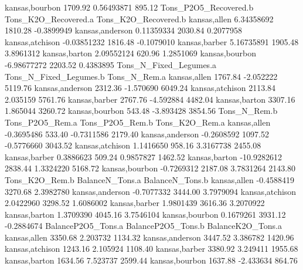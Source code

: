 \documentclass{report}
\begin{document}
\begin{Schunk}
\begin{Soutput}
kansas,bourbon             1709.92         0.56493871                895.12
                Tons_P2O5_Recovered.b Tons_K2O_Recovered.a Tons_K2O_Recovered.b
kansas,allen               6.34358692              1810.28           -0.3899949
kansas,anderson            0.11359334              2030.84            0.2077958
kansas,atchison           -0.03851232              1816.48           -0.1079010
kansas,barber              5.16735891              1905.48            3.8961312
kansas,barton              2.09552124               620.96            1.2851069
kansas,bourbon            -6.98677272              2203.52            0.4383895
                Tons_N_Fixed_Legumes.a Tons_N_Fixed_Legumes.b Tons_N_Rem.a
kansas,allen                   1767.84              -2.052222      5119.76
kansas,anderson                2312.36              -1.570690      6049.24
kansas,atchison                2113.84               2.035159      5761.76
kansas,barber                  2767.76              -4.592884      4482.04
kansas,barton                  3307.16               1.865044      3260.72
kansas,bourbon                  543.48              -3.893428      3854.56
                Tons_N_Rem.b Tons_P2O5_Rem.a Tons_P2O5_Rem.b Tons_K2O_Rem.a
kansas,allen      -0.3695486          533.40      -0.7311586        2179.40
kansas,anderson   -0.2608592         1097.52      -0.5776660        3043.52
kansas,atchison    1.1416650          958.16       3.3167738        2455.08
kansas,barber      0.3886623          509.24       0.9857827        1462.52
kansas,barton    -10.9282612         2838.44       1.3324220        5168.72
kansas,bourbon    -0.7269312         2187.08       3.7831264        2143.80
                Tons_K2O_Rem.b BalanceN_Tons.a BalanceN_Tons.b
kansas,allen        -0.4588419         3270.68       2.3982780
kansas,anderson     -0.7077332         3444.00       3.7979094
kansas,atchison      2.0422960         3298.52       1.6086002
kansas,barber        1.9801439         3616.36       3.2070922
kansas,barton        1.3709390         4045.16       3.7546104
kansas,bourbon       0.1679261         3931.12      -0.2884674
                BalanceP2O5_Tons.a BalanceP2O5_Tons.b BalanceK2O_Tons.a
kansas,allen               3350.68           2.203732           1134.32
kansas,anderson            3447.52           3.386782           1420.96
kansas,atchison            1243.16           2.105924           1108.40
kansas,barber              3380.92           3.249411           1955.68
kansas,barton              1634.56           7.523737           2599.44
kansas,bourbon             1637.88          -2.433634            864.76

\end{Soutput}
\end{Schunk}
\end{document}
